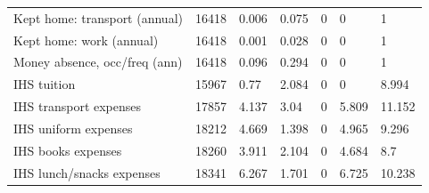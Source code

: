 \begin{table}[!h]
{\begin{tabular}[t]{lllllll}
\hspace{1em}Kept home: transport (annual) & 16418 & 0.006 & 0.075 & 0 & 0 & 1\\
\hspace{1em}Kept home: work (annual) & 16418 & 0.001 & 0.028 & 0 & 0 & 1\\
\hspace{1em}Money absence, occ/freq (ann) & 16418 & 0.096 & 0.294 & 0 & 0 & 1\\
\hspace{1em}IHS tuition & 15967 & 0.77 & 2.084 & 0 & 0 & 8.994\\
\hspace{1em}IHS transport expenses & 17857 & 4.137 & 3.04 & 0 & 5.809 & 11.152\\
\hspace{1em}IHS uniform expenses & 18212 & 4.669 & 1.398 & 0 & 4.965 & 9.296\\
\hspace{1em}IHS books expenses & 18260 & 3.911 & 2.104 & 0 & 4.684 & 8.7\\
\hspace{1em}IHS lunch/snacks expenses & 18341 & 6.267 & 1.701 & 0 & 6.725 & 10.238\\
\bottomrule
\end{tabular}}
\end{table}
